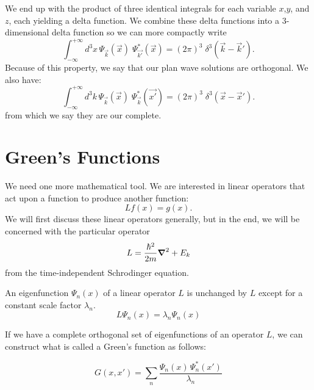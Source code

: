 \documentclass[12pt]{article}
\begin{document}
We end up with the product of three identical integrals for each variable
$x$,$y$, and $z$, each yielding a delta function.  We combine these delta functions into a 3-dimensional delta function so we can more compactly write
\begin{equation} \label{eqn:planeorth}
\int^{+\infty}_{-\infty} d^3x 
\, \Psi_{\vec{k}}(\vec{x}) 
\; \Psi^*_{\vec{k'}}(\vec{x}) 
= (2 \pi)^3 \; \delta^3(\vec{k}-\vec{k}').
\end{equation}
Because of this property, we say that our plan wave solutions 
are orthogonal.  We also have:
\begin{equation} \label{eqn:planecomplete}
\int^{+\infty}_{-\infty} d^3k 
\, \Psi_{\vec{k}}(\vec{x}) 
\; \Psi^*_{\vec{k}}(\vec{x'}) 
= (2 \pi)^3 \; \delta^3(\vec{x}-\vec{x}').
\end{equation}
from which we say they are our complete.

\section{Green's Functions}

We need one more mathematical tool.  We are interested in linear operators that act upon a function to produce another function:
\begin{displaymath}
L f(x) = g(x).
\end{displaymath}
We will first discuss these linear operators generally, but in the end, we will
be concerned with the particular operator
\begin{displaymath}
L = \frac{\hbar^2}{2m} \mbox{\boldmath$ \nabla $} ^2 + E_k
\end{displaymath}
from the time-independent Schrodinger equation.

An eigenfunction $\Psi_n(x)$ of a linear operator $L$ is unchanged by $L$ except for a constant scale factor $\lambda_n$. 
\begin{displaymath}
L \Psi_n(x) = \lambda_n \Psi_n(x)
\end{displaymath}

If we have a complete orthogonal set of eigenfunctions of an operator $L$, we
can construct what is called a Green's function as follows:

\begin{equation} \label{eqn:green}
G(x,x') = \sum_n \frac{\Psi_n(x) \, \Psi^*_n(x')}{\lambda_n}
\end{equation}
\end{document}
